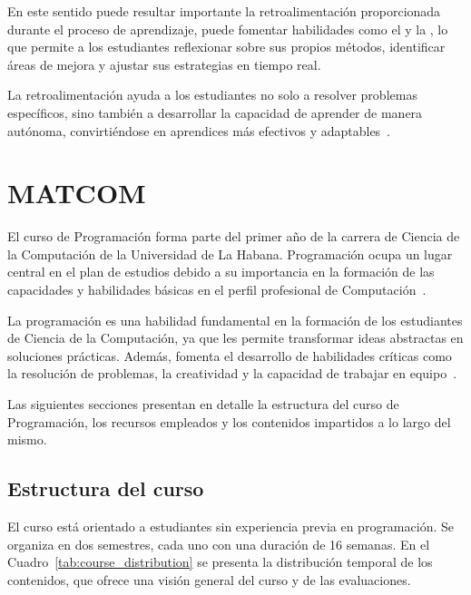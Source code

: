 \documentclass{article}
\begin{document}
En este sentido puede resultar importante la retroalimentación proporcionada durante el proceso de aprendizaje, puede fomentar habilidades como el  y la , lo que permite a los estudiantes reflexionar sobre sus propios métodos, identificar áreas de mejora y ajustar sus estrategias en tiempo real.

La retroalimentación ayuda a los estudiantes no solo a resolver problemas específicos, sino también a desarrollar la capacidad de aprender de manera autónoma, convirtiéndose en aprendices más efectivos y adaptables~\cite{shute2008focus}.


\section{MATCOM}

El curso de Programación forma parte del primer año de la carrera de Ciencia de la Computación de la Universidad de La Habana. Programación ocupa un lugar central en el plan de estudios debido a su importancia en la formación de las capacidades y habilidades básicas en el perfil profesional de Computación~\cite{plan_estudio_e_2017}.

La programación es una habilidad fundamental en la formación de los estudiantes de Ciencia de la Computación, ya que les permite transformar ideas abstractas en soluciones prácticas. Además, fomenta el desarrollo de habilidades críticas como la resolución de problemas, la creatividad y la capacidad de trabajar en equipo~\cite{plan_estudio_e_2017}.

Las siguientes secciones presentan en detalle la estructura del curso de Programación, los recursos empleados y los contenidos impartidos a lo largo del mismo.

\subsection{Estructura del curso}

El curso está orientado a estudiantes sin experiencia previa en programación. Se organiza en dos semestres, cada uno con una duración de 16 semanas. En el Cuadro~\ref{tab:course_distribution} se presenta la distribución temporal de los contenidos, que ofrece una visión general del curso y de las evaluaciones.
\end{document}
